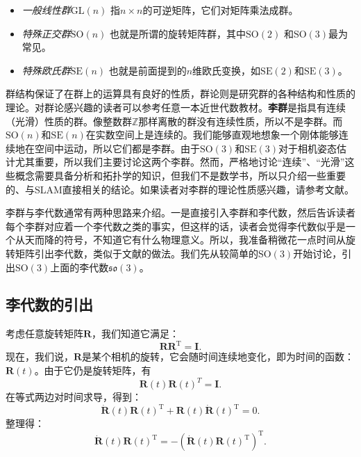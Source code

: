 \begin{itemize}
\item \emph{一般线性群$\mathrm{GL}(n)$} \quad 指$n \times n$的可逆矩阵，它们对矩阵乘法成群。

\item \emph{特殊正交群$\mathrm{SO}(n)$} \quad 也就是所谓的旋转矩阵群，其中$\mathrm{SO}(2)$ 和$\mathrm{SO}(3)$最为常见。

\item \emph{特殊欧氏群$\mathrm{SE}(n)$} \quad 也就是前面提到的$n$维欧氏变换，如$\mathrm{SE}(2)$和$\mathrm{SE}(3)$。
\end{itemize}

群结构保证了在群上的运算具有良好的性质，群论则是研究群的各种结构和性质的理论。对群论感兴趣的读者可以参考任意一本近世代数教材。\textbf{李群}是指具有连续（光滑）性质的群。像整数群$\mathbb{Z}$那样离散的群没有连续性质，所以不是李群。而$\mathrm{SO}(n)$和$\mathrm{SE}(n)$在实数空间上是连续的。我们能够直观地想象一个刚体能够连续地在空间中运动，所以它们都是李群。由于$\mathrm{SO}(3)$和$\mathrm{SE}(3)$对于相机姿态估计尤其重要，所以我们主要讨论这两个李群。然而，严格地讨论“连续”、“光滑”这些概念需要具备分析和拓扑学的知识，但我们不是数学书，所以只介绍一些重要的、与SLAM直接相关的结论。如果读者对李群的理论性质感兴趣，请参考文献\cite{Varadarajan2013}。

李群与李代数通常有两种思路来介绍。一是直接引入李群和李代数，然后告诉读者每个李群对应着一个李代数之类的事实，但这样的话，读者会觉得李代数似乎是一个从天而降的符号，不知道它有什么物理意义。所以，我准备稍微花一点时间从旋转矩阵引出李代数，类似于文献\cite{Ma2012}的做法。我们先从较简单的$\mathrm{SO}(3)$开始讨论，引出$\mathrm{SO}(3)$上面的李代数$\mathfrak{so}(3)$。

\subsection{李代数的引出}
考虑任意旋转矩阵$\bm{R}$，我们知道它满足：
\begin{equation}
\bm{R} \bm{R}^\mathrm{T}=\bm{I}.
\end{equation}
现在，我们说，$\bm{R}$是某个相机的旋转，它会随时间连续地变化，即为时间的函数：$\bm{R}(t)$。由于它仍是旋转矩阵，有
\[
\bm{R}(t) \bm{R}(t) ^T = \bm{I}.
\]
在等式两边对时间求导，得到：
\[
\bm{\dot{R}} (t) \bm{R} {(t)^\mathrm{T}} + \bm{R} (t) \bm{\dot{R}} {(t)^\mathrm{T}} = 0.
\]
整理得：
\begin{equation}
\bm{\dot{R}} (t) \bm{R} {(t)^\mathrm{T}} = - \left(  \bm{\dot{R}} (t) \bm{R} {(t)^\mathrm{T}} \right)^\mathrm{T} .
\end{equation}

